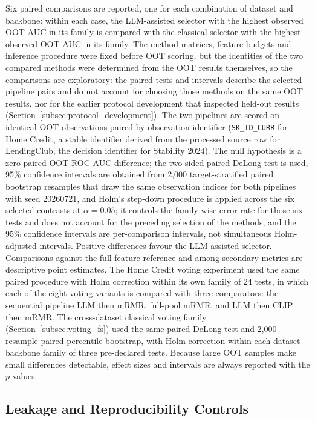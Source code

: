 \documentclass[final,5p,twocolumn]{elsarticle}
\begin{document}
Six paired comparisons are reported, one for each combination of dataset and backbone: within each case, the LLM-assisted selector with the highest observed OOT AUC in its family is compared with the classical selector with the highest observed OOT AUC in its family. The method matrices, feature budgets and inference procedure were fixed before OOT scoring, but the identities of the two compared methods were determined from the OOT results themselves, so the comparisons are exploratory: the paired tests and intervals describe the selected pipeline pairs and do not account for choosing those methods on the same OOT results, nor for the earlier protocol development that inspected held-out results (Section~\ref{subsec:protocol_development}). The two pipelines are scored on identical OOT observations paired by observation identifier (\texttt{SK\_\allowbreak ID\_\allowbreak CURR} for Home Credit, a stable identifier derived from the processed source row for LendingClub, the decision identifier for Stability 2024). The null hypothesis is a zero paired OOT ROC-AUC difference; the two-sided paired DeLong test \cite{delong1988} is used, 95\% confidence intervals are obtained from 2,000 target-stratified paired bootstrap resamples that draw the same observation indices for both pipelines \cite{efron1993} with seed 20260721, and Holm's step-down procedure \cite{holm1979} is applied across the six selected contrasts at $\alpha=0.05$; it controls the family-wise error rate for those six tests and does not account for the preceding selection of the methods, and the 95\% confidence intervals are per-comparison intervals, not simultaneous Holm-adjusted intervals. Positive differences favour the LLM-assisted selector. Comparisons against the full-feature reference and among secondary metrics are descriptive point estimates. The Home Credit voting experiment used the same paired procedure with Holm correction within its own family of 24 tests, in which each of the eight voting variants is compared with three comparators: the sequential pipeline LLM then mRMR, full-pool mRMR, and LLM then CLIP then mRMR. The cross-dataset classical voting family (Section~\ref{subsec:voting_fs}) used the same paired DeLong test and 2,000-resample paired percentile bootstrap, with Holm correction within each dataset--backbone family of three pre-declared tests. Because large OOT samples make small differences detectable, effect sizes and intervals are always reported with the $p$-values \cite{demsar2006}.

\subsection{Leakage and Reproducibility Controls}
\label{subsec:leakage_controls}
\end{document}

